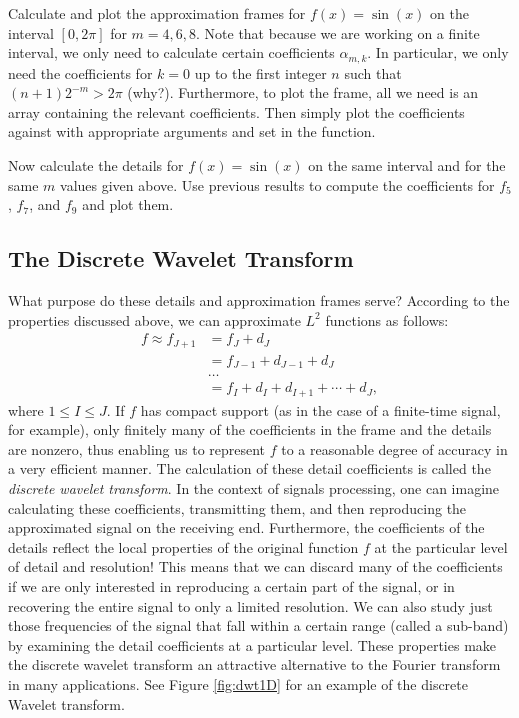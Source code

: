 \begin{problem}
Calculate and plot the approximation frames for $f(x) = \sin(x)$ on the interval $[0,2\pi]$
for $m = 4, 6, 8$. Note that because we are working on a finite interval,
we only need to calculate certain coefficients $\alpha_{m,k}$. In
particular, we only need the coefficients for $k = 0$ up to the first integer
$n$ such that $(n+1)2^{-m} > 2 \pi$ (why?). Furthermore, to plot the frame,
all we need is an array containing the relevant coefficients. Then simply plot
the coefficients against  with appropriate arguments
and set  in the  function.
\end{problem}

\begin{problem}
Now calculate the details for $f(x) = \sin(x)$ on the same interval and for the
same $m$ values given above. Use previous results to compute the coefficients
for $f_5$, $f_7$, and $f_9$ and plot them.
\end{problem}

\subsection*{The Discrete Wavelet Transform}

What purpose do these details and approximation frames serve? According to the
properties discussed above, we can approximate $L^2$ functions as follows:
\begin{align*}
f \approx f_{J+1} &= f_J + d_J \\
&= f_{J-1} + d_{J-1} + d_J \\
& \ldots\\
&= f_{I} + d_{I} + d_{I+1} + \cdots + d_J,
\end{align*}
where $1 \leq I \leq J$. If $f$ has compact support (as in the case of a finite-time signal,
for example), only finitely many of the coefficients in the frame and the details are
nonzero, thus enabling us to represent $f$ to a reasonable degree of accuracy in a very
efficient manner. The calculation of these detail coefficients is called the \emph{discrete
wavelet transform}. In the context of signals processing, one can imagine calculating these
coefficients, transmitting them, and then reproducing the approximated signal on the
receiving end. Furthermore, the coefficients of the details reflect the local properties
of the original function $f$ at the particular level of detail and resolution! This means
that we can discard many of the coefficients if we are only interested in reproducing a certain
part of the signal, or in recovering the entire signal to only a limited resolution. We can
also study just those frequencies of the signal that fall within a certain range (called a
sub-band) by examining the detail coefficients at a particular level. These
properties make the discrete wavelet transform an attractive alternative to the Fourier
transform in many applications. See Figure \ref{fig:dwt1D} for an example of the discrete Wavelet transform.

